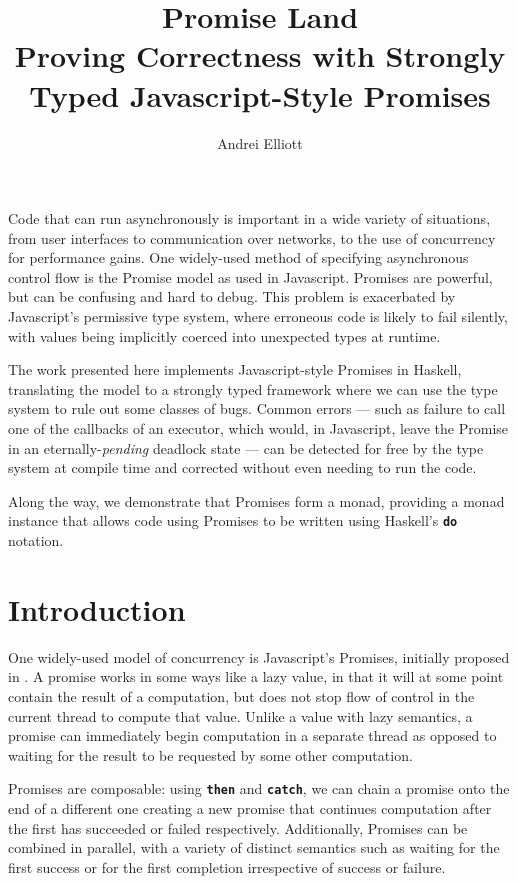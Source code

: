 \documentclass[12pt, english, letterpaper]{kuthesis}
\title{Promise Land\\
\smaller Proving Correctness with Strongly Typed Javascript-Style Promises}
\author{Andrei Elliott}
\newcommand{\lit}[1]{\textbf{\texttt{#1}}}
\begin{document}
\begin{romanpages}
  \maketitle
  \begin{abstractlong}
    Code that can run asynchronously is important in a wide variety of situations, from user interfaces to communication over networks, to the use of concurrency for performance gains.  One widely-used method of specifying asynchronous control flow is the \textsf{Promise} model as used in Javascript.  \textsf{Promises} are powerful, but can be confusing and hard to debug.  This problem is exacerbated by Javascript’s permissive type system, where erroneous code is likely to fail silently, with values being implicitly coerced into unexpected types at runtime.

The work presented here implements Javascript-style \textsf{Promises} in Haskell, translating the model to a strongly typed framework where we can use the type system to rule out some classes of bugs.  Common errors --- such as failure to call one of the callbacks of an executor, which would, in Javascript, leave the \textsf{Promise} in an eternally-\emph{pending} deadlock state --- can be detected for free by the type system at compile time and corrected without even needing to run the code.

Along the way, we demonstrate that \textsf{Promises} form a monad, providing a monad instance that allows code using \textsf{Promises} to be written using Haskell’s \lit{do} notation.
  \end{abstractlong}
\end{romanpages}

\chapter*{Introduction}
One widely-used model of concurrency is Javascript's \textsf{Promises}, initially proposed in \cite{friedman}.  A promise works in some ways like a lazy value, in that it will at some point contain the result of a computation, but does not stop flow of control in the current thread to compute that value.  Unlike a value with lazy semantics, a promise can immediately begin computation in a separate thread as opposed to waiting for the result to be requested by some other computation.

\textsf{Promises} are composable: using \lit{then} and \lit{catch}, we can chain a promise onto the end of a different one creating a new promise that continues computation after the first has succeeded or failed respectively.  Additionally, \textsf{Promises} can be combined in parallel, with a variety of distinct semantics such as waiting for the first success or for the first completion irrespective of success or failure.
\end{document}
